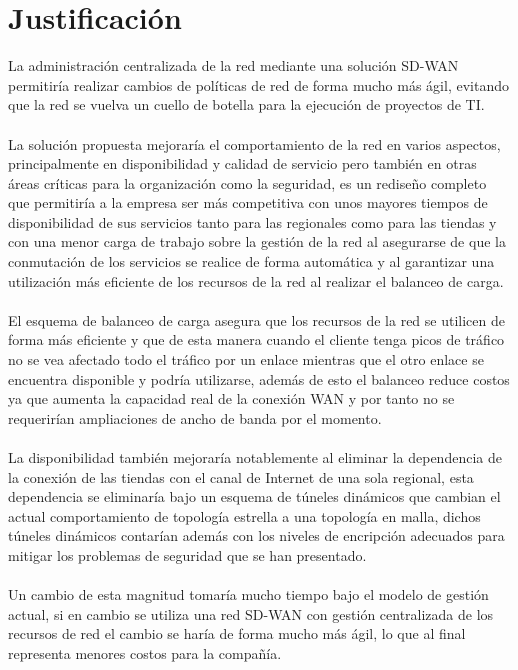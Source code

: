 \chapter{Justificación}
\label{cha:Justificación}


La administración centralizada de la red mediante una solución SD-WAN permitiría realizar cambios de políticas de red de forma mucho más ágil, evitando que la red se vuelva un cuello de botella para la ejecución de proyectos de TI.
\\
\\
	La solución propuesta mejoraría el comportamiento de la red en varios aspectos, principalmente en disponibilidad y calidad de servicio pero también en otras áreas críticas para la organización como la seguridad, es un rediseño completo que permitiría a la empresa ser más competitiva con unos mayores tiempos de disponibilidad de sus servicios tanto para las regionales como para las tiendas y con una menor carga de trabajo sobre la gestión de la red al asegurarse de que la conmutación de los servicios se realice de forma automática y al garantizar una utilización más eficiente de los recursos de la red al realizar el balanceo de carga.
\\
\\
	El esquema de balanceo de carga asegura que los recursos de la red se utilicen de forma más eficiente y que de esta manera cuando el cliente tenga picos de tráfico no se vea afectado todo el tráfico por un enlace mientras que el otro enlace se encuentra disponible y podría utilizarse, además de esto el balanceo reduce costos ya que aumenta la capacidad real de la conexión WAN y por tanto no se requerirían ampliaciones de ancho de banda por el momento.
\\
\\
	La disponibilidad también mejoraría notablemente al eliminar la dependencia de la conexión de las tiendas con el canal de Internet de una sola regional, esta dependencia se eliminaría bajo un esquema de túneles dinámicos que cambian el actual comportamiento de topología estrella a una topología en malla, dichos túneles dinámicos contarían además con los niveles de encripción adecuados para mitigar los problemas de seguridad que se han presentado.
\\
\\
	Un cambio de esta magnitud tomaría mucho tiempo bajo el modelo de gestión actual, si en cambio se utiliza una red SD-WAN con gestión centralizada de los recursos de red el cambio se haría de forma mucho más ágil, lo que al final representa menores costos para la compañía.
